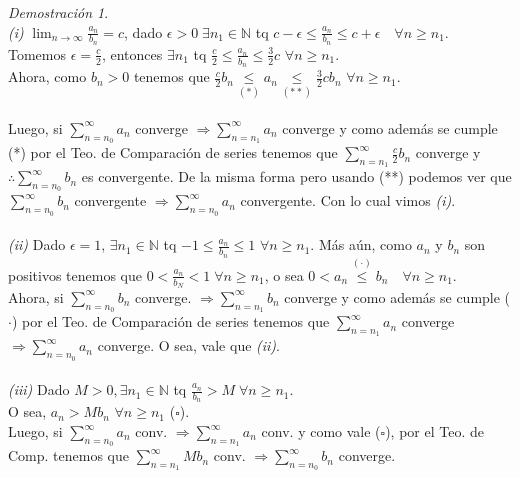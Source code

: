 \documentclass{article}
\theoremstyle{definition}
\theoremstyle{remark}
\newtheorem*{demo}{Demostración}
\begin{document}
\begin{demo} \; \\
  \emph{(i)} \quad $\lim_{n\to\infty}{\frac{a_n}{b_n}}=c$, dado $\epsilon > 0 \; \exists n_1 \in \mathbb{N}$ tq $c-\epsilon \leq \frac{a_n}{b_n} \leq c+\epsilon \quad \forall n \geq n_1$. \\ 
  Tomemos $\epsilon = \frac{c}{2}$, entonces $\exists n_1$ tq $\frac{c}{2} \leq \frac{a_n}{b_n} \leq \frac{3}{2}c$ \quad $\forall n \geq n_1$.\\ Ahora, como $b_n >0$ tenemos que $\frac{c}{2}b_n \underset{(*)}{\leq}a_n \underset{(**)}{\leq} \frac{3}{2} c b_n$ \quad $\forall n \geq n_1$. \\\\
  Luego, si $\sum_{n=n_0}^{\infty}{a_n}$ converge $\Rightarrow \sum_{n=n_1}^{\infty}{a_n}$ converge y como además se cumple (*) por el Teo. de Comparación de series tenemos que $\sum_{n=n_1}^{\infty}{\frac{c}{2}b_n}$ converge y $\therefore \sum_{n=n_0}^{\infty}{b_n}$ es convergente. De la misma forma pero usando (**) podemos ver que \\ 
  $\sum_{n=n_0}^{\infty}{b_n}$ convergente $\Rightarrow \sum_{n=n_0}^{\infty}{a_n}$ convergente. 
Con lo cual vimos \emph{(i)}. \\ \\
\emph{(ii)} Dado $\epsilon=1$, $\exists n_1 \in \mathbb{N}$ tq $-1 \leq \frac{a_n}{b_n} \leq 1$ \; $\forall n \geq n_1$. Más aún, como $a_n$ y $b_n$ son positivos tenemos que $0 < \frac{a_n}{b_N}<1 \; \forall n \geq n_1 $, o sea $0 < a_n \overset{(\cdot)}{\leq}b_n \quad \forall n \geq n_1$. \\
Ahora, si $\sum_{n=n_0}^{\infty}{b_n}$ converge. $\Rightarrow \sum_{n=n_1}^{\infty}{b_n}$ converge y como además se cumple ($\cdot$) por el Teo. de Comparación de series tenemos que $\sum_{n=n_1}^{\infty}{a_n}$ converge $\Rightarrow \sum_{n=n_0}^{\infty}{a_n}$ converge. O sea, vale que \emph{(ii)}. \\ \\ 
\emph{(iii)} Dado $M>0, \exists n_1 \in \mathbb{N}$ tq $\frac{a_n}{b_n} > M \; \forall n \geq n_1$. \\
O sea, $a_n > Mb_n $ \quad $\forall n \geq n_1$ ($\square$). \\
Luego, si $\sum_{n=n_0}^{\infty}{a_n}$ conv. $\Rightarrow \sum_{n=n_1}^{\infty}{a_n}$ conv. y como vale ($\square$), por el Teo. de Comp. tenemos que $\sum_{n=n_1}^{\infty}{Mb_n}$ conv. $\Rightarrow \sum_{n=n_0}^{\infty}{b_n}$ converge.
\end{demo}
\end{document}
